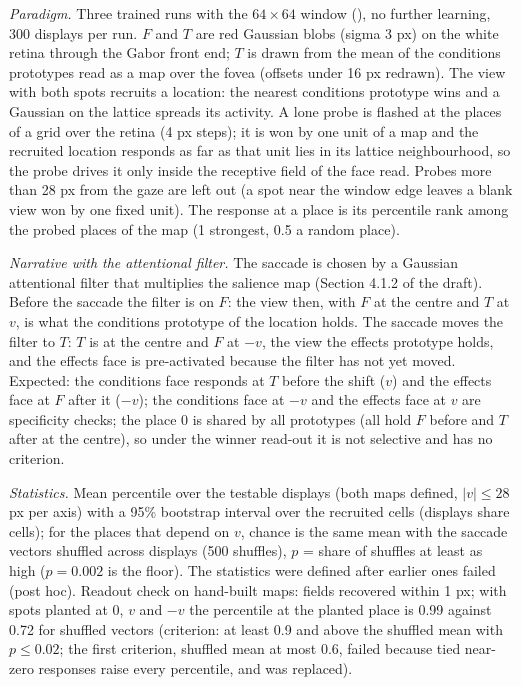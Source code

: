 \documentclass[11pt,a4paper]{article}
\newcommand{\code}[1]{\path{#1}}
\begin{document}
\emph{Paradigm.} Three trained runs with the $64\times64$ window (\code{tests/phase_fixed_pilot_2026-10-10}), no further
learning, 300 displays per run. $F$ and $T$ are red Gaussian blobs (sigma 3 px) on the white retina through the Gabor front end;
$T$ is drawn from the mean of the conditions prototypes read as a map over the fovea (offsets under 16 px redrawn). The view with
both spots recruits a location: the nearest conditions prototype wins and a Gaussian on the lattice spreads its activity. A lone
probe is flashed at the places of a grid over the retina (4 px steps); it is won by one unit of a map and the recruited location
responds as far as that unit lies in its lattice neighbourhood, so the probe drives it only inside the receptive field of the face
read. Probes more than 28 px from the gaze are left out (a spot near the window edge leaves a blank view won by one fixed unit).
The response at a place is its percentile rank among the probed places of the map (1 strongest, 0.5 a random place).

\emph{Narrative with the attentional filter.} The saccade is chosen by a Gaussian attentional filter that multiplies the salience
map (Section 4.1.2 of the draft). Before the saccade the filter is on $F$: the view then, with $F$ at the centre and $T$ at $v$,
is what the conditions prototype of the location holds. The saccade moves the filter to $T$: $T$ is at the centre and $F$ at $-v$,
the view the effects prototype holds, and the effects face is pre-activated because the filter has not yet moved. Expected: the
conditions face responds at $T$ before the shift ($v$) and the effects face at $F$ after it ($-v$); the conditions face at $-v$ and
the effects face at $v$ are specificity checks; the place 0 is shared by all prototypes (all hold $F$ before and $T$ after at the
centre), so under the winner read-out it is not selective and has no criterion.

\emph{Statistics.} Mean percentile over the testable displays (both maps defined, $|v|\le28$ px per axis) with a 95\% bootstrap
interval over the recruited cells (displays share cells); for the places that depend on $v$, chance is the same mean with the
saccade vectors shuffled across displays (500 shuffles), $p$ = share of shuffles at least as high ($p=0.002$ is the floor).
The statistics were defined after earlier ones failed (post hoc). Readout check on hand-built maps: fields recovered within 1 px;
with spots planted at 0, $v$ and $-v$ the percentile at the planted place is 0.99 against 0.72 for shuffled vectors (criterion:
at least 0.9 and above the shuffled mean with $p\le0.02$; the first criterion, shuffled mean at most 0.6, failed because tied
near-zero responses raise every percentile, and was replaced).
\end{document}
